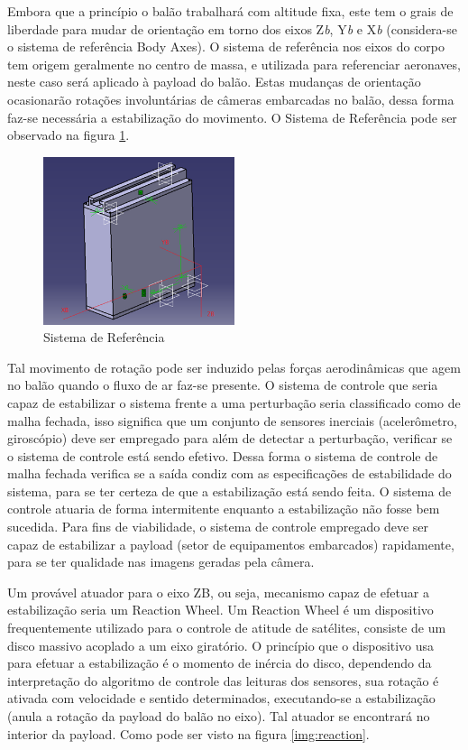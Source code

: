 Embora que a princípio o balão trabalhará com altitude fixa, este tem o grais de liberdade para mudar de orientação em torno dos eixos Z\textit{b}, Y\textit{b} e X\textit{b} (considera-se o sistema de referência Body Axes). O sistema de referência nos eixos do corpo tem origem geralmente no centro de massa, e utilizada para referenciar aeronaves, neste caso será aplicado à payload do balão. Estas mudanças de orientação ocasionarão rotações involuntárias de câmeras embarcadas no balão, dessa forma faz-se necessária a estabilização do movimento. O Sistema de Referência pode ser observado na figura \ref{img:sistReferencia}.

	\begin{figure}[H]
		\centering
		\includegraphics[width=0.5\textwidth]{figuras/sistReferencia}
		\caption{Sistema de Referência}
		\label{img:sistReferencia}
	\end{figure}

Tal movimento de rotação pode ser induzido pelas forças aerodinâmicas que agem no balão quando o fluxo de ar faz-se presente. O sistema de controle que seria capaz de estabilizar o sistema frente a uma perturbação seria classificado como de malha fechada, isso significa que um conjunto de sensores inerciais (acelerômetro, giroscópio) deve ser empregado para além de detectar a perturbação, verificar se o sistema de controle está sendo efetivo. Dessa forma o sistema de controle de malha fechada verifica se a saída condiz com as especificações de estabilidade do sistema, para se ter certeza de que a estabilização está sendo feita. O sistema de controle atuaria de forma intermitente enquanto a estabilização não fosse bem sucedida. Para fins de viabilidade, o sistema de controle empregado deve ser capaz de estabilizar a payload (setor de equipamentos embarcados) rapidamente, para se ter qualidade nas imagens geradas pela câmera.

Um provável atuador para o eixo ZB, ou seja, mecanismo capaz de efetuar a estabilização seria um Reaction Wheel. Um Reaction Wheel é um dispositivo frequentemente utilizado para o controle de atitude de satélites, consiste de um disco massivo acoplado a um eixo giratório. O princípio que o dispositivo usa para efetuar a estabilização é o momento de inércia do disco, dependendo da interpretação do algoritmo de controle das leituras dos sensores, sua rotação é ativada com velocidade e sentido determinados, executando-se a estabilização (anula a rotação da payload do balão no eixo). Tal atuador se encontrará no interior da payload. Como pode ser visto na figura \ref{img:reaction}.

